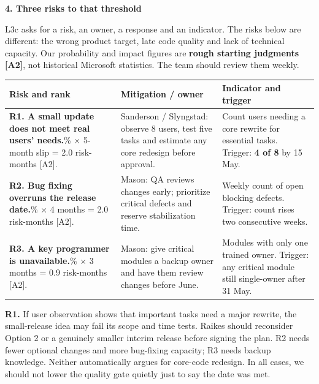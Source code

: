 \documentclass[11pt,a4paper]{article}
\newcommand{\Section}[1]{\par\vspace{6pt}\noindent{\fontsize{12.1}{15}\selectfont\bfseries #1}\par\vspace{2pt}}
\newcommand{\PageTitle}[1]{{\fontsize{16}{19.6}\selectfont\bfseries #1}\par\vspace{6pt}}
\newcommand{\SmallPara}[1]{{\fontsize{10.3}{13.7}\selectfont #1\par}\vspace{3pt}}
\newcommand{\TableFont}{\fontsize{9.9}{12.9}\selectfont}
\begin{document}
\PageTitle{4. Three risks to that threshold}
\SmallPara{L3c asks for a risk, an owner, a response and an indicator. The risks below are different: the wrong product target, late code quality and lack of technical capacity. Our probability and impact figures are \textbf{rough starting judgments [A2]}, not historical Microsoft statistics. The team should review them weekly.}
{\TableFont
\begin{tabularx}{\linewidth}{@{}P{170pt}P{152pt}Y@{}}
\toprule
\textbf{Risk and rank} & \textbf{Mitigation / owner} & \textbf{Indicator and trigger}\\\midrule
\textbf{R1. A small update does not meet real users' needs.}\newline [Boehm \#3--4]\% $\times$ 5-month slip = 2.0 risk-months [A2]. & Sanderson / Slyngstad: observe 8 users, test five tasks and estimate any core redesign before approval. & Count users needing a core rewrite for essential tasks. Trigger: \textbf{4 of 8} by 15 May.\\\midrule
\textbf{R2. Bug fixing overruns the release date.}\newline [Boehm \#2]\% $\times$ 4 months = 2.0 risk-months [A2]. & Mason: QA reviews changes early; prioritize critical defects and reserve stabilization time. & Weekly count of open blocking defects. Trigger: count rises two consecutive weeks.\\\midrule
\textbf{R3. A key programmer is unavailable.}\newline [Boehm \#1]\% $\times$ 3 months = 0.9 risk-months [A2]. & Mason: give critical modules a backup owner and have them review changes before June. & Modules with only one trained owner. Trigger: any critical module still single-owner after 31 May.\\\bottomrule
\end{tabularx}}
\Section{Which one changes the choice?}
\textbf{R1.} If user observation shows that important tasks need a major rewrite, the small-release idea may fail its scope and time tests. Raikes should reconsider Option 2 or a genuinely smaller interim release before signing the plan. R2 needs fewer optional changes and more bug-fixing capacity; R3 needs backup knowledge. Neither automatically argues for core-code redesign. In all cases, we should not lower the quality gate quietly just to say the date was met.
\end{document}
